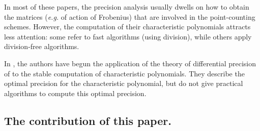 \documentclass[sigconf]{acmart}
\theoremstyle{definition}
\begin{document}
In most of these papers, the precision analysis usually
dwells on how to obtain the matrices (\textit{e.g.} of action of Frobenius)
that are involved in the point-counting schemes.
However, the computation of their characteristic polynomials 
attracts less attention: some
refer to fast algorithms (using division), while others
apply division-free algorithms.

In \cite{caruso-roe-vaccon:15a}, the authors have begun the application
of the theory of differential precision of \cite{caruso-roe-vaccon:14a}
to the stable computation of characteristic polynomials.
They describe the optimal precision
for the characteristic polynomial, but do not give practical algorithms
to compute this optimal precision.

\subsection*{The contribution of this paper.}
\end{document}
